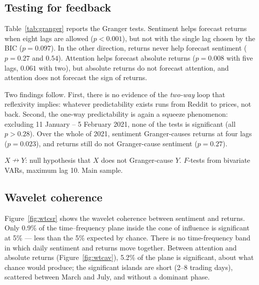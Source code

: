 \documentclass[11pt,a4paper]{article}
\begin{document}
\subsection{Testing for feedback}

Table~\ref{tab:granger} reports the Granger tests. Sentiment helps forecast
returns when eight lags are allowed ($p<0.001$), but not with the single lag
chosen by the BIC ($p=0.097$). In the other direction, returns never help
forecast sentiment ($p=0.27$ and $0.54$). Attention helps forecast absolute
returns ($p=0.008$ with five lags, $0.061$ with two), but absolute returns do not
forecast attention, and attention does not forecast the sign of returns.

Two findings follow. First, there is no evidence of the \emph{two-way} loop that
reflexivity implies: whatever predictability exists runs from Reddit to prices,
not back. Second, the one-way predictability is again a squeeze phenomenon:
excluding 11 January -- 5 February 2021, none of the tests is significant (all
$p>0.28$). Over the whole of 2021, sentiment Granger-causes returns at four lags
($p=0.023$), and returns still do not Granger-cause sentiment ($p=0.27$).

\begin{table}[htbp]
\centering
\caption{Granger causality tests}
\label{tab:granger}
\begin{small}

\end{small}
\par\smallskip\parbox{0.92\textwidth}{\footnotesize $X \nrightarrow Y$: null
hypothesis that $X$ does not Granger-cause $Y$. $F$-tests from bivariate VARs,
maximum lag 10. Main sample.}
\end{table}

\subsection{Wavelet coherence}

Figure~\ref{fig:wtcsr} shows the wavelet coherence between sentiment and returns.
Only 0.9\% of the time--frequency plane inside the cone of influence is
significant at 5\% --- less than the 5\% expected by chance. There is no
time-frequency band in which daily sentiment and returns move together. Between
attention and absolute returns (Figure~\ref{fig:wtcav}), 5.2\% of the plane is
significant, about what chance would produce; the significant islands are short
(2--8 trading days), scattered between March and July, and without a dominant
phase.
\end{document}
